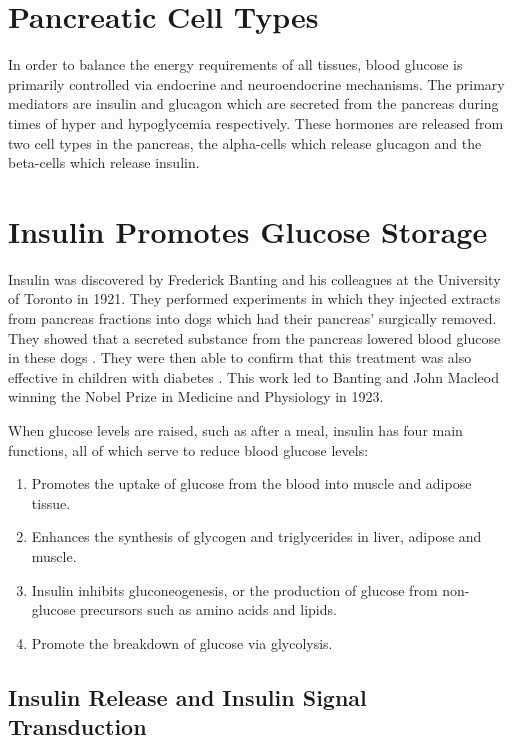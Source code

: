 \documentclass{tufte-handout}
\begin{document}
\section{Pancreatic Cell Types}

In order to balance the energy requirements of all tissues, blood glucose is primarily controlled via endocrine and neuroendocrine mechanisms.  The primary mediators are insulin and glucagon which are secreted from the pancreas during times of hyper and hypoglycemia respectively.  These hormones are released from two cell types in the pancreas, the alpha-cells which release glucagon and the beta-cells which release insulin.


\section{Insulin Promotes Glucose Storage}

Insulin was discovered by Frederick Banting and his colleagues at the University of Toronto in 1921.  They performed experiments in which they injected extracts from pancreas fractions into dogs which had their pancreas' surgically removed.  They showed that a secreted substance from the pancreas lowered blood glucose in these dogs \cite{Banting1922}.  They were then able to confirm that this treatment was also effective in children with diabetes \citep{Banting1922a}.  This work led to Banting and John Macleod winning the Nobel Prize in Medicine and Physiology in 1923.

When glucose levels are raised, such as after a meal, insulin has four main functions, all of which serve to reduce blood glucose levels:

\begin{enumerate}
\item Promotes the uptake of glucose from the blood into muscle and adipose tissue.  
\item Enhances the synthesis of glycogen and triglycerides in liver, adipose and muscle.  
\item Insulin inhibits gluconeogenesis, or the production of glucose from non-glucose precursors such as amino acids and lipids.
\item Promote the breakdown of glucose via glycolysis.
\end{enumerate}

\subsection{Insulin Release and Insulin Signal Transduction}
\end{document}
